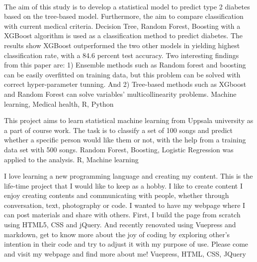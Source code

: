 %
%
%



\begin{projects}
{ \\ The aim of this study is to develop a statistical model to predict type 2 diabetes based on the tree-based model. Furthermore, the aim to compare classification with current medical criteria. Decision Tree, Random Forest, Boosting with a XGBoost algorithm is used as a classification method to predict diabetes. The results show XGBoost outperformed the two other models in yielding highest classification rate, with a 84.6 percent test accuracy. Two interesting findings from this paper are: 1) Ensemble methods such as Random forest and boosting can be easily overfitted on training data, but this problem can be solved with correct hyper-parameter tunning. And 2) Tree-based methods such as XGboost and Random Forest can solve variables' multicollinearity problems.}
{Machine learning, Medical health, R, Python}

\end{projects}


\begin{projects}
{  }
{This project aims to learn statistical machine learning from Uppsala university as a part of course work. The task is to classify a set of 100 songs and predict whether a specific person would like them or not, with the help from a training data set with 500 songs. Random Forest, Boosting, Logistic Regression was applied to the analysis.}
{R, Machine learning}

\end{projects}

\begin{projects}
{  }
{I love learning a new programming language and creating my content. 
This is the life-time project that I would like to keep as a hobby. I like to create content I enjoy creating contents and communicating with people, whether through conversation, text, photography or code. I wanted to have my webpage where I can post materials and share with others. First, I build the page from scratch using HTML5, CSS and jQuery. And recently renovated using Vuepress and markdown,  get to know more about the joy of coding by exploring other's intention in their code and try to adjust it with my purpose of use. Please come and visit my webpage and find more about me!}
{Vuepress, HTML, CSS, JQuery}   
\end{projects}


